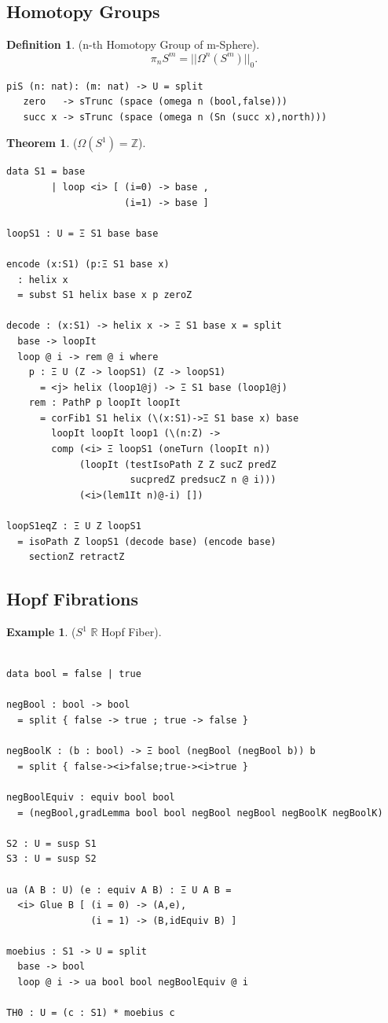 \documentclass{article}
\theoremstyle{definition}
\newtheorem{definition}{Definition}
\newtheorem{theorem}{Theorem}
\newtheorem{example}{Example}
\begin{document}
\newpage
\subsection{Homotopy Groups}

\begin{definition} (n-th Homotopy Group of m-Sphere).
$$\pi_{n}S^{m} = ||\Omega^{n}(S^{m})||_0.$$
\begin{lstlisting}
piS (n: nat): (m: nat) -> U = split
   zero   -> sTrunc (space (omega n (bool,false)))
   succ x -> sTrunc (space (omega n (Sn (succ x),north)))
\end{lstlisting}
\end{definition}

\begin{theorem} ($\Omega(S^1)=\mathbb{Z}$).
\begin{lstlisting}
data S1 = base
        | loop <i> [ (i=0) -> base ,
                     (i=1) -> base ]

loopS1 : U = Ξ S1 base base

encode (x:S1) (p:Ξ S1 base x)
  : helix x
  = subst S1 helix base x p zeroZ

decode : (x:S1) -> helix x -> Ξ S1 base x = split
  base -> loopIt
  loop @ i -> rem @ i where
    p : Ξ U (Z -> loopS1) (Z -> loopS1)
      = <j> helix (loop1@j) -> Ξ S1 base (loop1@j)
    rem : PathP p loopIt loopIt
      = corFib1 S1 helix (\(x:S1)->Ξ S1 base x) base
        loopIt loopIt loop1 (\(n:Z) ->
        comp (<i> Ξ loopS1 (oneTurn (loopIt n))
             (loopIt (testIsoPath Z Z sucZ predZ
                      sucpredZ predsucZ n @ i)))
             (<i>(lem1It n)@-i) [])

loopS1eqZ : Ξ U Z loopS1
  = isoPath Z loopS1 (decode base) (encode base)
    sectionZ retractZ
\end{lstlisting}
\end{theorem}

\newpage
\subsection{Hopf Fibrations}

\begin{example} ($S^1$ $\mathbb{R}$ Hopf Fiber).
\begin{lstlisting}

data bool = false | true

negBool : bool -> bool
  = split { false -> true ; true -> false }

negBoolK : (b : bool) -> Ξ bool (negBool (negBool b)) b
  = split { false-><i>false;true-><i>true }

negBoolEquiv : equiv bool bool
  = (negBool,gradLemma bool bool negBool negBool negBoolK negBoolK)

S2 : U = susp S1
S3 : U = susp S2

ua (A B : U) (e : equiv A B) : Ξ U A B =
  <i> Glue B [ (i = 0) -> (A,e),
               (i = 1) -> (B,idEquiv B) ]

moebius : S1 -> U = split
  base -> bool
  loop @ i -> ua bool bool negBoolEquiv @ i

TH0 : U = (c : S1) * moebius c
\end{lstlisting}
\end{example}
\end{document}
